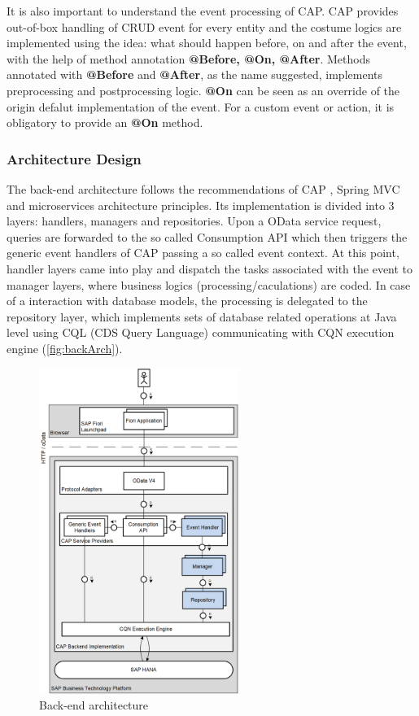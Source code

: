 \bigskip
It is also important to understand the event processing of CAP. CAP provides out-of-box handling of CRUD event for every entity and the costume logics are implemented using the idea: what should happen before, on and after the event, with the help of method annotation \textbf{@Before, @On, @After}. Methods annotated with \textbf{@Before} and \textbf{@After}, as the name suggested, implements preprocessing and postprocessing logic. \textbf{@On} can be seen as an override of the origin defalut implementation of the event. For a custom event or action, it is obligatory to provide an \textbf{@On} method.

\subsubsection{Architecture Design}
\label{subsubsec:D-srv-design}

The back-end architecture follows the recommendations of CAP \cite{cap-java-architecture}, Spring MVC \cite{spring-mvc} and microservices architecture principles. Its implementation is divided into 3 layers: handlers, managers and repositories. Upon a OData service request, queries are forwarded to the so called Consumption API which then triggers the generic event handlers of CAP passing a so called event context. At this point, handler layers came into play and dispatch the tasks associated with the event to manager layers, where business logics (processing/caculations) are coded. In case of a interaction with database models, the processing is delegated to the repository layer, which implements sets of database related operations at Java level using CQL (CDS Query Language) \cite{cap-cds-cql} communicating with CQN execution engine (\autoref{fig:backArch}). 

\begin{figure}[!htb]
	\centering
	\includegraphics[height=400px]{images/backend_architecture.png}
	\caption{Back-end architecture}
	\label{fig:backArch}
\end{figure}

